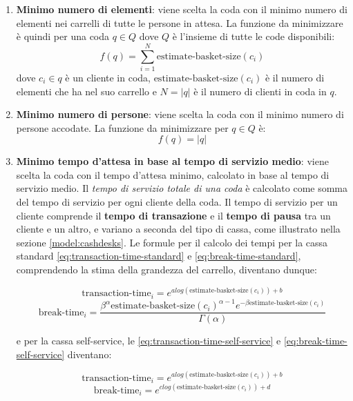 \begin{enumerate}
\item \textbf{Minimo numero di elementi}: viene scelta la coda con il minimo numero di elementi nei carrelli di tutte le persone in attesa. La funzione da minimizzare è quindi per una coda $q \in Q$ dove $Q$ è l'insieme di tutte le code disponibili:
\begin{equation}
f(q) = \sum\limits_{i=1}^N \text{estimate-basket-size}(c_i) 
\end{equation}
dove $c_i \in q$ è un cliente in coda, $\text{estimate-basket-size}(c_i)$ è il numero di elementi che ha nel suo carrello e $N = |q|$ è il numero di clienti in coda in $q$.
\item \textbf{Minimo numero di persone}: viene scelta la coda con il minimo numero di persone accodate. La funzione da minimizzare per $q \in Q$ è:
\begin{equation}
f(q) = |q|
\end{equation}
\item \textbf{Minimo tempo d'attesa in base al tempo di servizio medio}:
viene scelta la coda con il tempo d'attesa minimo, calcolato in base al tempo di servizio medio.
Il \textit{tempo di servizio totale di una coda} è calcolato come somma del tempo di servizio per ogni cliente della coda. Il tempo di servizio per un cliente comprende il \textbf{tempo di transazione} e il \textbf{tempo di pausa} tra un cliente e un altro, e variano a seconda del tipo di cassa, come illustrato nella sezione \ref{model:cashdesks}. Le formule per il calcolo dei tempi per la cassa standard \ref{eq:transaction-time-standard} e \ref{eq:break-time-standard}, comprendendo la stima della grandezza del carrello, diventano dunque:

\begin{equation}\label{eq:transaction-time-standard-estimate}
\text{transaction-time}_i = e^{a log(\text{estimate-basket-size}(c_i)) + b}
\end{equation}
\begin{equation}\label{eq:break-time-standard-estimate}
\text{break-time}_i = \frac{\beta^{\alpha} \text{estimate-basket-size}(c_i)^{\alpha - 1} e^{- \beta \text{estimate-basket-size}(c_i)}}{\Gamma (\alpha)}
\end{equation}

e per la cassa self-service, le \ref{eq:transaction-time-self-service} e \ref{eq:break-time-self-service} diventano:

\begin{equation}\label{eq:transaction-time-self-service-estimate}
\text{transaction-time}_i = e^{a log(\text{estimate-basket-size}(c_i)) + b}
\end{equation}
\begin{equation}\label{eq:break-time-self-service-estimate}
\text{break-time}_i = e^{c log(\text{estimate-basket-size}(c_i)) + d}
\end{equation}


\end{enumerate}
